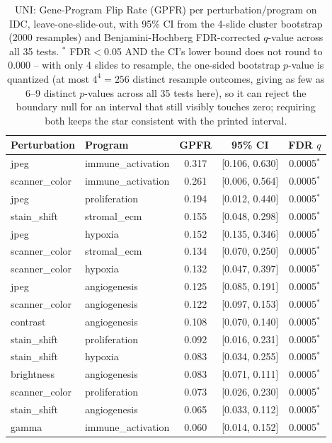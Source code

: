 \begin{table}[t]
\centering
\caption{UNI: Gene-Program Flip Rate (GPFR) per perturbation/program on IDC, leave-one-slide-out, with 95\% CI from the 4-slide cluster bootstrap (2000 resamples) and Benjamini-Hochberg FDR-corrected $q$-value across all 35 tests. $^{*}$ FDR$<$0.05 AND the CI's lower bound does not round to 0.000 -- with only 4 slides to resample, the one-sided bootstrap $p$-value is quantized (at most $4^4=256$ distinct resample outcomes, giving as few as 6--9 distinct $p$-values across all 35 tests here), so it can reject the boundary null for an interval that still visibly touches zero; requiring both keeps the star consistent with the printed interval.}
\label{tab:gpfr_loso_idc_uni}
\begin{tabular}{llccc}
\toprule
Perturbation & Program & GPFR & 95\% CI & FDR $q$ \\
\midrule
jpeg & immune\_activation & 0.317 & [0.106, 0.630] & 0.0005$^{*}$ \\
scanner\_color & immune\_activation & 0.261 & [0.006, 0.564] & 0.0005$^{*}$ \\
jpeg & proliferation & 0.194 & [0.012, 0.440] & 0.0005$^{*}$ \\
stain\_shift & stromal\_ecm & 0.155 & [0.048, 0.298] & 0.0005$^{*}$ \\
jpeg & hypoxia & 0.152 & [0.135, 0.346] & 0.0005$^{*}$ \\
scanner\_color & stromal\_ecm & 0.134 & [0.070, 0.250] & 0.0005$^{*}$ \\
scanner\_color & hypoxia & 0.132 & [0.047, 0.397] & 0.0005$^{*}$ \\
jpeg & angiogenesis & 0.125 & [0.085, 0.191] & 0.0005$^{*}$ \\
scanner\_color & angiogenesis & 0.122 & [0.097, 0.153] & 0.0005$^{*}$ \\
contrast & angiogenesis & 0.108 & [0.070, 0.140] & 0.0005$^{*}$ \\
stain\_shift & proliferation & 0.092 & [0.016, 0.231] & 0.0005$^{*}$ \\
stain\_shift & hypoxia & 0.083 & [0.034, 0.255] & 0.0005$^{*}$ \\
brightness & angiogenesis & 0.083 & [0.071, 0.111] & 0.0005$^{*}$ \\
scanner\_color & proliferation & 0.073 & [0.026, 0.230] & 0.0005$^{*}$ \\
stain\_shift & angiogenesis & 0.065 & [0.033, 0.112] & 0.0005$^{*}$ \\
gamma & immune\_activation & 0.060 & [0.014, 0.152] & 0.0005$^{*}$ \\

\end{tabular}
\end{table}
